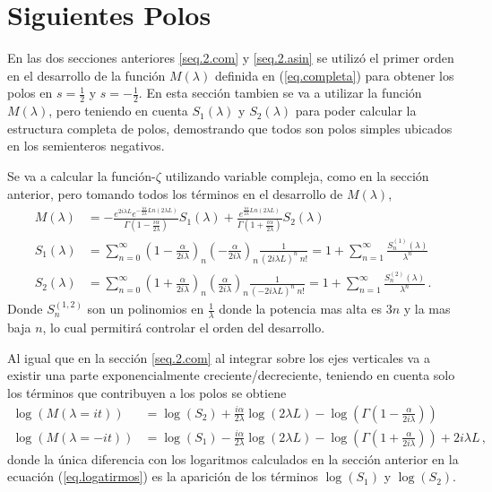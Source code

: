 \section{Siguientes Polos}\label{sec.sig.polos}


En las dos secciones anteriores \ref{seq.2.com} y \ref{seq.2.asin} se utilizó el primer orden en el desarrollo de la función $ M (\lambda )$ definida en (\ref{eq.completa}) para obtener los polos en $s= \frac{1}{2}$ y $s=- \frac{1}{2}$. En esta sección tambien se va a utilizar la función $M ( \lambda )$, pero teniendo en cuenta $S _1 ( \lambda ) $ y $S _2 ( \lambda )$ para poder calcular la estructura completa de polos, demostrando que todos son polos simples ubicados en los semienteros negativos. 


Se va a calcular la función-$\zeta$ utilizando variable compleja, como en la sección anterior, pero tomando todos los términos en el desarrollo de $M ( \lambda )$,
\begin{align}
\label{larga}
M( \lambda ) &= 
-
 \frac{e ^{2 i \lambda L } e ^{ - \frac{i \alpha  }{2 \lambda } Ln \left( 2 \lambda L \right) }  }
      { \Gamma \left( 1 - \frac{i \alpha}{2  \lambda}  \right) } S _1 ( \lambda ) +
 \frac{ e ^{   \frac{i \alpha  } {2 \lambda } Ln \left(2 \lambda L \right) } }
      { \Gamma \left( 1 + \frac{i \alpha}{2  \lambda}  \right)   } S _2 ( \lambda )        
\\[10pt]      
	S _1 ( \lambda ) &= \sum _{n=0} ^{ \infty }
\left(1 - \frac{ \alpha}{2 i \lambda}  \right) _n
\left(- \frac{ \alpha}{2 i \lambda}  \right) _n
\frac{1}{( 2 i \lambda L ) ^n \ n!} = 
	1 + \sum _{n=1} ^{\infty} \frac{S ^{(1)} _n (\lambda)}{\lambda ^n} 
\nonumber
\\[10pt]
	S _2 (\lambda ) &= \sum _{n=0 } ^{\infty}
\left( 1 + \frac{ \alpha}{2 i \lambda }  \right) _n
\left( \frac{ \alpha }{2 i \lambda} \right) _n
\frac{1}{( - 2 i \lambda L ) ^n \ n!} = 
1 + \sum _{n=1} ^{\infty} \frac{S ^{(2)} _n (\lambda)}{\lambda ^n}
\nonumber
\, .
\end{align}
Donde $S _n ^{(1,2)}$ son un polinomios en $\frac{1}{ \lambda}$ donde la potencia mas alta es $3 n$ y la mas baja $n$, lo cual permitirá controlar el orden del desarrollo.


Al igual que en la sección \ref{seq.2.com} al integrar sobre los ejes verticales va a existir una parte exponencialmente creciente/decreciente, teniendo en cuenta solo los términos que contribuyen a los polos se obtiene
\begin{align}
	\log ( M ( \lambda = i t ) ) 
&
	=   \log (S _2) + 
	\frac{i \alpha }{2 \lambda}  \log (2 \lambda L) - 
 	\log \left( \Gamma \left( 1 - \frac{ \alpha}{2 i \lambda} \right) \right) 
\\ 
	\log ( M ( \lambda=-i t ) ) 
&
	=  \log (S _1) -  
	\frac{i \alpha }{2 \lambda}  \log ( 2 \lambda L ) - 
	\log \left( \Gamma \left( 1 + \frac{ \alpha}{2 i \lambda} \right) \right) +
	2 i \lambda L  \nonumber
	\,	,
\end{align}
donde la única diferencia con los logaritmos calculados en la sección anterior en la ecuación (\ref{eq.logatirmos}) es la aparición de los términos $\log ( S _1 )$ y $ \log ( S _2) $.

